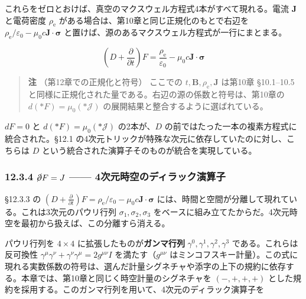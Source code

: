 \documentclass[a4paper,12pt,openany]{book}
\begin{document}
これらをゼロとおけば、真空のマクスウェル方程式4本がすべて現れる。電流
\(\mathbf{J}\) と電荷密度 \(\rho_{\mathrm e}\)
がある場合は、第10章と同じ正規化のもとで右辺を
\(\rho_{\mathrm e}/\varepsilon_0 - \mu_0 c \mathbf{J}\!\cdot\!\bm{\sigma}\)
と置けば、源のあるマクスウェル方程式が一行にまとまる。

\[(D + \frac{\partial}{\partial t})F = \frac{\rho_{\mathrm e}}{\varepsilon_0} - \mu_0 c \mathbf{J}\!\cdot\!\bm{\sigma}\]

\begin{quote}
\textbf{注} （第12章での正規化と符号） ここでの
\(t, \mathbf{B}, \rho_{\mathrm e}, \mathbf{J}\) は第10章 §10.1–10.5
と同様に正規化された量である。右辺の源の係数と符号は、第10章の
\(d(\ast F) = \mu_0(\ast\mathcal{J})\)
の展開結果と整合するように選ばれている。
\end{quote}

\(dF=0\) と \(d(\ast F)=\mu_0(\ast\mathcal{J})\) の2本が、\(D\)
の前ではたった一本の複素方程式に統合された。§12.1
の4次元トリックが特殊な次元に依存していたのに対し、こちらは \(D\)
という統合された演算子そのものが統合を実現している。

\hypertarget{cancelpartial-f-j-4ux6b21ux5143ux6642ux7a7aux306eux30c7ux30a3ux30e9ux30c3ux30afux6f14ux7b97ux5b50}{%
\subsubsection{\texorpdfstring{12.3.4 \(\cancel{\partial} F = J\) ——
4次元時空のディラック演算子}{12.3.4 \textbackslash cancel\{\textbackslash partial\} F = J —— 4次元時空のディラック演算子}}\label{cancelpartial-f-j-4ux6b21ux5143ux6642ux7a7aux306eux30c7ux30a3ux30e9ux30c3ux30afux6f14ux7b97ux5b50}}

§12.3.3 の
\((D + \frac{\partial}{\partial t})F = \rho_{\mathrm e}/\varepsilon_0 - \mu_0 c \mathbf{J}\!\cdot\!\bm{\sigma}\)
には、時間と空間が分離して現れている。これは3次元のパウリ行列
\(\sigma_1,\sigma_2,\sigma_3\)
をベースに組み立てたからだ。4次元時空を最初から扱えば、この分離すら消える。

パウリ行列を \(4\times4\) に拡張したものが\textbf{ガンマ行列}
\(\gamma^0,\gamma^1,\gamma^2,\gamma^3\) である。これらは反可換性
\(\gamma^\mu\gamma^\nu + \gamma^\nu\gamma^\mu = 2g^{\mu\nu}I\)
を満たす（\(g^{\mu\nu}\)
はミンコフスキー計量）。この式に現れる実数係数の符号は、選んだ計量シグネチャや添字の上下の規約に依存する。本章では、第10章と同じく時空計量のシグネチャを
\((-,+,+,+)\)
とした規約を採用する。このガンマ行列を用いて、4次元のディラック演算子を
\end{document}
